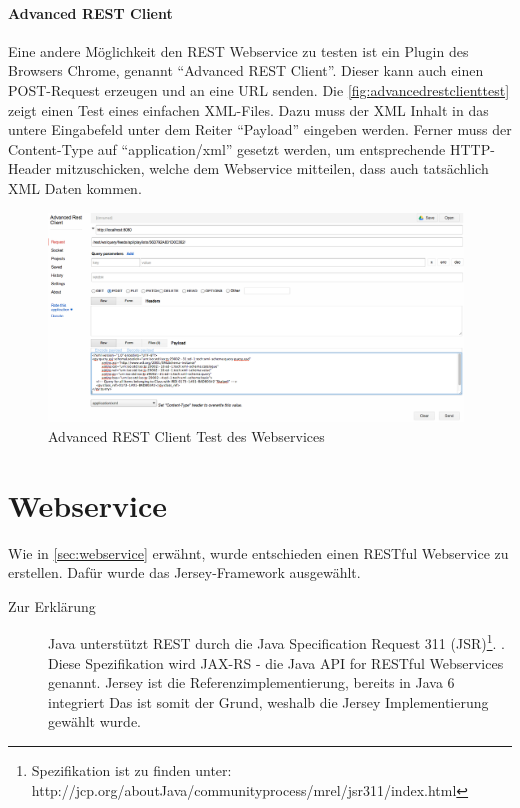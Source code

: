 \paragraph{Advanced REST Client} 

Eine andere Möglichkeit den \gls{REST} Webservice zu testen ist ein Plugin des Browsers Chrome, genannt \enquote{Advanced REST Client}. Dieser kann auch einen POST-Request erzeugen und an eine URL senden. Die \autoref{fig:advancedrestclienttest} zeigt einen Test eines einfachen XML-Files. Dazu muss der XML Inhalt in das untere Eingabefeld unter dem Reiter \enquote{Payload} eingeben werden. Ferner muss der Content-Type auf \enquote{application/xml} gesetzt werden, um entsprechende HTTP-Header mitzuschicken, welche dem Webservice mitteilen, dass auch tatsächlich XML Daten kommen. 

\begin{figure}[htbp]
	\centering
		\includegraphics[width=0.98\textwidth]{images/advanced_rest_client_test.png}
	\caption{Advanced REST Client Test des Webservices}
	\label{fig:advancedrestclienttest}
\end{figure}

\section{Webservice}\label{kap:webservice}

Wie in \autoref{sec:webservice} erwähnt, wurde entschieden einen \gls{REST}ful \gls{Webservice} zu erstellen. Dafür wurde das \gls{Jersey}-Framework ausgewählt. 

\begin{description}
\item[Zur Erklärung] Java unterstützt REST durch die Java Specification Request 311 (JSR)\footnote{Spezifikation ist zu finden unter: http://jcp.org/aboutJava/communityprocess/mrel/jsr311/index.html}. . Diese Spezifikation wird JAX-RS - die Java API for RESTful Webservices genannt. Jersey ist die Referenzimplementierung, bereits in Java 6 integriert Das ist somit der Grund, weshalb die Jersey Implementierung gewählt wurde.  
\end{description}

